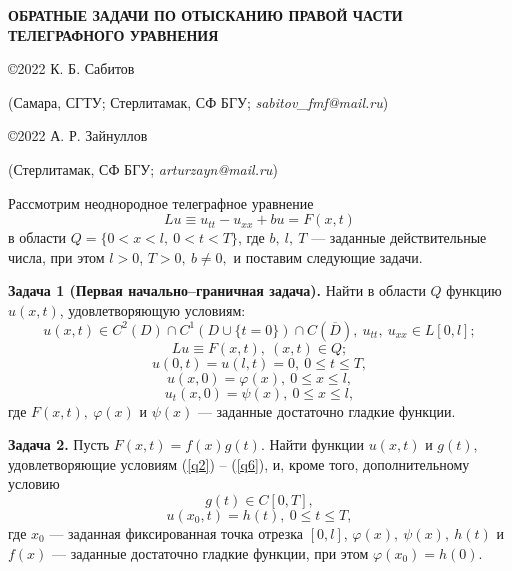 \documentclass[12pt]{article}
\begin{document}
\begin{center}
{\bf ОБРАТНЫЕ ЗАДАЧИ ПО ОТЫСКАНИЮ ПРАВОЙ ЧАСТИ ТЕЛЕГРАФНОГО УРАВНЕНИЯ}
\medskip

\copyright2022 К. Б. Сабитов

(Самара, СГТУ; Стерлитамак, СФ БГУ; \emph{sabitov\_fmf@mail.ru})

\copyright2022 А. Р. Зайнуллов

(Стерлитамак, СФ БГУ; \emph{arturzayn@mail.ru})
\end{center}
\medskip

Рассмотрим неоднородное телеграфное уравнение
\begin{equation}\label{q1}Lu\equiv u_{tt}-u_{xx}+bu=F(x,t)\end{equation}
в области $Q=\{0<x<l,\ 0<t<T\}$, где $b,\ l,\ T$ --- заданные действительные числа, при этом $l>0$, $T>0,\ b\not=0,$ и поставим следующие задачи.

\textbf{Задача 1 (Первая начально--граничная задача).} Найти в области $Q$ функцию $u(x,t)$, удовлетворяющую условиям:
\begin{equation}\label{q2}u(x,t)\in C^2(D)\cap C^1(D\cup\{t=0\})\cap C(\overline{D}),\ u_{tt},\ u_{xx}\in L[0,l];\end{equation}
\begin{equation}\label{q3}Lu\equiv F(x,t),\ (x,t)\in Q;\end{equation}
\begin{equation}\label{q4}u(0,t)=u(l,t)=0,\ 0\leqslant t\leqslant T,\end{equation}
\begin{equation}\label{q5}u(x,0)=\varphi(x),\ 0\leqslant x\leqslant l,\end{equation}
\begin{equation}\label{q6}u_t(x,0)=\psi(x),\ 0\leqslant x\leqslant l,\end{equation}
где $F(x,t),\ \varphi(x)$ и $\psi(x)$ --- заданные достаточно гладкие функции.

{\bf Задача 2.} Пусть $F(x,t)=f(x)g(t)$. Найти функции $u(x,t)$ и $g(t)$, удовлетворяющие условиям (\ref{q2}) -- (\ref{q6}), и, кроме того, дополнительному условию
\begin{equation}\label{q8.1.0}g(t)\in C[0,T],\end{equation}
\begin{equation}\label{q8.1}u(x_0,t)=h(t),\ 0\leqslant t\leqslant T,\end{equation}
где $x_0$ --- заданная фиксированная точка отрезка $[0,l]$, $\varphi(x),\ \psi(x),\ h(t)$ и $f(x)$ --- заданные достаточно гладкие функции, при этом $\varphi(x_0)=h(0).$
\end{document}
